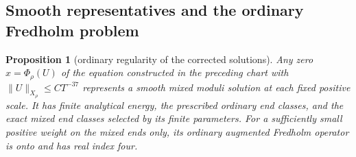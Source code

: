 \documentclass[11pt]{amsart}
\newtheorem{proposition}[theorem]{Proposition}
\theoremstyle{definition}
\theoremstyle{remark}
\theoremstyle{plain}
\begin{document}
\subsection{Smooth representatives and the ordinary Fredholm problem}

\begin{proposition}[ordinary regularity of the corrected solutions]
\label{prop:gluing-standard-regularity}
Any zero $x=\Phi_\rho(U)$ of the equation constructed in the preceding
chart with $\|U\|_{X_\rho}\leq CT^{-37}$ represents a smooth
mixed moduli solution at each fixed positive scale. It has finite
analytical energy, the prescribed ordinary end classes, and the exact
mixed end classes selected by its finite parameters. For a sufficiently
small positive weight on the mixed ends only, its ordinary augmented
Fredholm operator is onto and has real index four.
\end{proposition}
\end{document}
